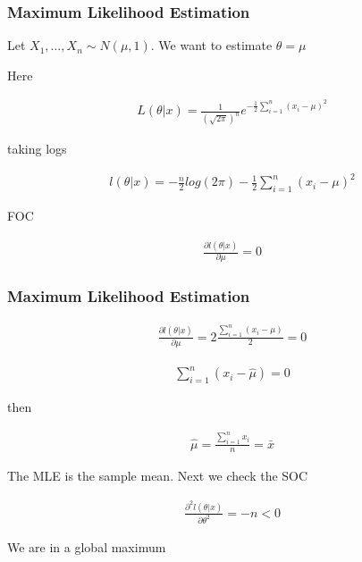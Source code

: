 \documentclass[
  shownotes,
  xcolor={svgnames},
  hyperref={colorlinks,citecolor=DarkBlue,linkcolor=DarkRed,urlcolor=DarkBlue}
  ]{beamer}
\begin{document}
\begin{frame}[fragile]
\frametitle{Maximum Likelihood Estimation}

 Let $X_1,\dots,X_n \sim N(\mu,1)$. We want to estimate $\theta = \mu$

Here

\begin{align}
L(\theta |x)=\frac{1}{(\sqrt{2\pi})^{n}}e^{-\frac{1}{2}\sum_{i=1}^{n}(x_i-\mu)^2}
\end{align}


taking logs 

\begin{align}
l\left(\theta |x\right)=-\frac{n}{2}log\left(2\pi\right)-\frac{1}{2}\sum_{i=1}^{n}(x_i-\mu)^2
\end{align}

FOC

\begin{align}
\frac{\partial l\left(\theta |x\right)}{\partial\mu}=0
\end{align}


\end{frame}

\begin{frame}[fragile]
\frametitle{Maximum Likelihood Estimation}

\begin{align}
\frac{\partial l\left(\theta |x\right)}{\partial\mu}=2\frac{\sum_{i=1}^{n}\left(x_{i}-\mu\right)}{2}=0
\end{align}


\begin{align}
\sum_{i=1}^{n}\left(x_{i}-\hat{\mu}\right)=0
\end{align}

then

\begin{align}
\hat{\mu}=\frac{\sum_{i=1}^{n}x_{i}}{n}=\bar{x}
\end{align}

The MLE is the sample mean. Next we check the SOC


\begin{align}
\frac{\partial^2l(\theta|x)}{\partial \theta^2}=-n<0
\end{align}

We are in  a global maximum

\end{frame}
\end{document}

